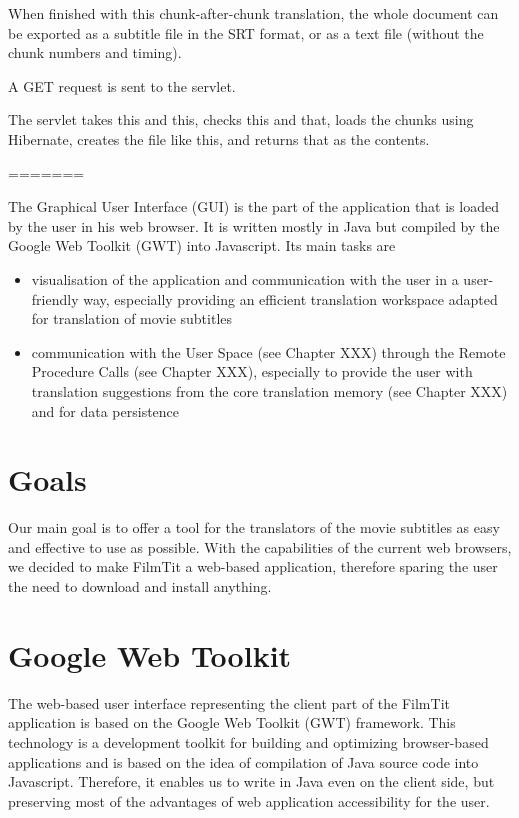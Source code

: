 
When finished with this chunk-after-chunk translation, the whole document can be exported as a subtitle file in the SRT format, or as a text file (without the chunk numbers and timing).

A GET request is sent to the servlet.

The servlet takes this and this, checks this and that, loads the chunks using Hibernate, creates the file like this, and returns that as the contents.

=======

The Graphical User Interface (GUI) is the part of the application that is loaded by the user in his web browser. It is written mostly in Java but compiled by the Google Web Toolkit (GWT) into Javascript. Its main tasks are

\begin{itemize}
\item visualisation of the application and communication with the user in a user-friendly way, especially providing an efficient translation workspace adapted for translation of movie subtitles
\item communication with the User Space (see Chapter XXX) through the Remote Procedure Calls (see Chapter XXX), especially to provide the user with translation suggestions from the core translation memory (see Chapter XXX) and for data persistence
\end{itemize}

\section{Goals}
Our main goal is to offer a tool for the translators of the movie subtitles as easy and effective to use as possible. With the capabilities of the current web browsers, we decided to make FilmTit a web-based application, therefore sparing the user the need to download and install anything.

\section{Google Web Toolkit}
The web-based user interface representing the client part of the FilmTit application is based on the Google Web Toolkit (GWT) framework. This technology is a development toolkit for building and optimizing browser-based applications %
and is based on the idea of compilation of Java source code into Javascript. Therefore, it enables us to write in Java even on the client side, but preserving most of the advantages of web application accessibility for the user.

